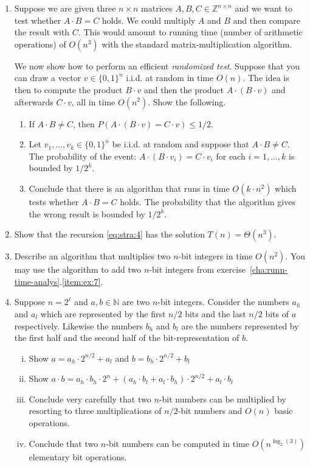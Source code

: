 \begin{enumerate}
\item Suppose we are given three $n×n$ matrices $A,B,C ∈ ℤ^{n×n}$ and we want to test whether $A ⋅ B = C$ holds. We could multiply $A$ and $B$ and then compare the result with $C$. This would amount to running time (number of arithmetic operations) of $O(n^3)$ with the standard matrix-multiplication algorithm. 

We now show how to perform an efficient \emph{randomized test}. Suppose that you can draw a vector $v ∈ \{0,1\}^n$  i.i.d. at random in time $O(n)$. The idea is then to compute the product $B ⋅v$ and then the product $A ⋅ (B ⋅v)$ and afterwards $C ⋅ v$, all in time $O(n^2)$. Show the following. 

\begin{enumerate}
\item If $A⋅B \neq C$, then $P(A ⋅ (B ⋅v) = C⋅v) ≤1/2$. 
\item Let $v_1,\dots,v_k∈ \{0,1\}^n$ be i.i.d. at random and suppose that  $A⋅B \neq C$. The probability of the event: $A ⋅ (B ⋅v_i) = C⋅v_i$ for each $i=1,\dots,k$ is bounded by $1/2^k$. 
\item Conclude that there is an algorithm that runs in time $O(k⋅n^2)$ which tests whether $A⋅B = C$ holds. The probability that the algorithm gives the wrong result is bounded by $1/2^k$. 
\end{enumerate}
\item Show that the recursion \eqref{eq:stra:4} has the solution $T(n) = Θ (n^3)$.  \label{item:str:4}
\item Describe an algorithm that multiplies two $n$-bit integers in time $O(n^2)$. You may use the algorithm to add two $n$-bit integers from exercise~\ref{cha:runn-time-analys}.\ref{item:ex:7}.  
\item Suppose $n = 2^\ell $  and $a,b ∈ ℕ$ are two $n$-bit integers. Consider the numbers $a_h$ and $a_l$ which are represented by the first $n/2$ bits and the last $n/2$ bits of $a$ respectively. Likewise the numbers $b_h$ and $b_l$ are the numbers represented by the first half and the second half of the bit-representation of $b$. 
  \begin{enumerate}[i)]
  \item Show $a = a_h ⋅ 2^{n/2} + a_l$ and  $b = b_h ⋅ 2^{n/2} + b_l$
  \item Show $a⋅b = a_h ⋅ b_h ⋅ 2^n + (a_h ⋅ b_l + a_l ⋅ b_h) ⋅2^{n/2} + a_l ⋅b_l$ 
  \item Conclude very carefully that two $n$-bit
    numbers can be multiplied by resorting to three multiplications of
    $n/2$-bit numbers and $O(n)$ basic  operations.
  \item Conclude that two $n$-bit
    numbers can be computed in time $O(n^{\log_2(3)})$
    elementary bit operations.
  \end{enumerate}




\end{enumerate}

